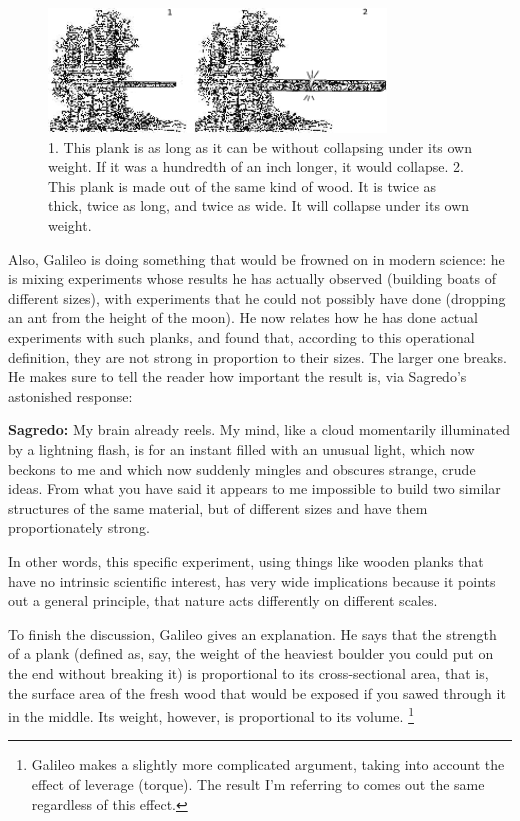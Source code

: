 \begin{figure}[h]
\begin{center}
\includegraphics[width=0.8\textwidth]{./scaling/figs/galileo-plank}
\end{center}
\label{galileo-plank}
\caption{ 1. This plank is as long as it can be
 without collapsing under its own weight. If it was a hundredth of an inch
 longer, it would collapse. 2. This plank is made out of the same kind of
 wood. It is twice as thick, twice as long, and twice as wide. It will
 collapse under its own weight.}
\end{figure}

Also, Galileo is doing something that would be frowned on in
modern science: he is mixing experiments whose results he
has actually observed (building boats of different sizes),
with experiments that he could not possibly have done
(dropping an ant from the height of the moon).
He now relates how he has done actual experiments with such
planks, and found that, according to this operational
definition, they are not strong in proportion to their
sizes. The larger one breaks. He makes sure to tell the
reader how important the result is, via Sagredo's astonished response:

\textbf{Sagredo:} My brain already reels. My mind, like a cloud
momentarily illuminated by a lightning flash, is for an
instant filled with an unusual light, which now beckons to
me and which now suddenly mingles and obscures strange,
crude ideas. From what you have said it appears to me
impossible to build two similar structures of the same
material, but of different sizes and have them proportionately strong.

In other words, this specific experiment, using things like
wooden planks that have no intrinsic scientific interest,
has very wide implications because it points out a general
principle, that nature acts differently on different scales.


To finish the discussion, Galileo gives an explanation. He
says that the strength of a plank (defined as, say, the
weight of the heaviest boulder you could put on the end
without breaking it) is proportional to its cross-sectional
area, that is, the surface area of the fresh wood that would
be exposed if you sawed through it in the middle. Its
weight, however, is proportional to its volume.
\footnote{Galileo
makes a slightly more complicated argument, taking into account
the effect of leverage (torque). The result I'm
referring to comes out the same regardless of this effect.}

